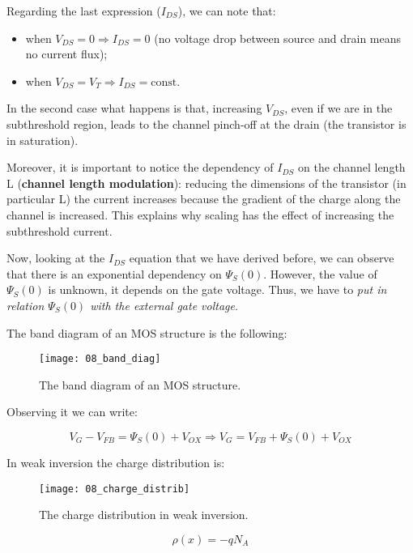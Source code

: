 \documentclass[a4paper, 12pt, twoside, openright]{report}
\begin{document}
Regarding the last expression ($I_{DS}$), we can note that:

\begin{itemize}
\item when $V_{DS} = 0 \Rightarrow I_{DS} = 0$ (no voltage drop between source and drain means no current flux);
\item when $V_{DS} = V_T \Rightarrow I_{DS} = \text{const.}$
\end{itemize}

In the second case what happens is that, increasing $V_{DS}$, even if we are in the subthreshold region, leads to the channel pinch-off at the drain (the transistor is in saturation).

Moreover, it is important to notice the dependency of $I_{DS}$ on the channel length L (\textbf{channel length modulation}): reducing the dimensions of the transistor (in particular L) the current increases because the gradient of the charge along the channel is increased. This explains why scaling has the effect of increasing the subthreshold current.

Now, looking at the $I_{DS}$ equation that we have derived before, we can observe that there is an exponential dependency on $\Psi_S(0)$. However, the value of $\Psi_S(0)$ is unknown, it depends on the gate voltage. Thus, we have to \emph{put in relation $\Psi_S(0)$ with the external gate voltage}.

The band diagram of an MOS structure is the following:

	\begin{figure}[H]
	\centering
	\texttt{[image: 08\_band\_diag]}
	\caption{The band diagram of an MOS structure.}
	\label{}
	\end{figure}

Observing it we can write:

\begin{equation}
V_G - V_{FB} = \Psi_S(0) + V_{OX} \Rightarrow V_G = V_{FB} + \Psi_S(0) + V_{OX}
\label{Vg}
\end{equation}

In weak inversion the charge distribution is:

	\begin{figure}[H]
	\centering
	\texttt{[image: 08\_charge\_distrib]}
	\caption{The charge distribution in weak inversion.}
	\label{}
	\end{figure}

\begin{equation}
\rho(x) = -qN_A
\label{}
\end{equation}
\end{document}
